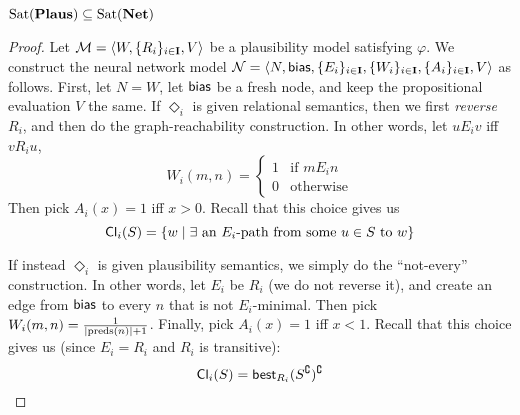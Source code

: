 \documentclass[letterpaper]{article}
\begin{document}
\begin{proposition}
    $\mathrm{Sat}( \textrm{\textbf{Plaus}} ) \subseteq \mathrm{Sat}( \textrm{\textbf{Net}} )$
\end{proposition}
\begin{proof}
    Let $\mathcal{M} = \langle W, \{ R_i \}_{i \in \textbf{I}}, V \rangle$ be a plausibility model satisfying $\varphi$.  We construct the neural network model $\mathcal{N} = \langle N, \mathsf{bias}, \{ E_i \}_{i \in \textbf{I}}, \{ W_i \}_{i \in \textbf{I}}, \{ A_i \}_{i \in \textbf{I}}, V \rangle$ as follows.  First, let $N = W$, let $\mathsf{bias}$ be a fresh node, and keep the propositional evaluation $V$ the same.  If $\Diamond_i$ is given relational semantics, then we first \emph{reverse} $R_i$, and then do the graph-reachability construction.  In other words, let $u{E_i}v$ iff $v{R_i}u$, 
    \[
        W_i(m, n) = 
        \begin{cases}
            1 & \mbox{if } m{E_i}n \\
            0 & \mbox{otherwise}
        \end{cases}
    \]
    Then pick $A_i(x) = 1$ iff $x > 0$.  Recall that this choice gives us
    \[
        \mathsf{Cl}_i(S) = \{ w \mid \exists \mbox{ an } E_i\mbox{-path from some } u \in S \mbox{ to } w \}            
    \]

    If instead $\Diamond_i$ is given plausibility semantics, we simply do the ``not-every'' construction.  In other words, let $E_i$ be $R_i$ (we do not reverse it), and create an edge from $\mathsf{bias}$ to every $n$ that is not $E_i$-minimal.  Then pick $W_i(m, n) = \frac{1}{|\mathrm{preds}(n)|+1}$.  Finally, pick $A_i(x) = 1$ iff $x < 1$.  Recall that this choice gives us (since $E_i = R_i$ and $R_i$ is transitive):
    \[
        \mathsf{Cl}_i(S) = \mathsf{best}_{R_i}(S^\complement)^\complement
    \]
    

\end{proof}
\end{document}
